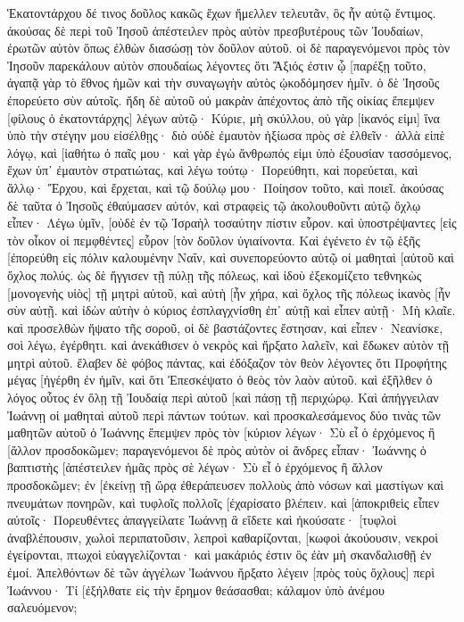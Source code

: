 Ἑκατοντάρχου δέ τινος δοῦλος κακῶς ἔχων ἤμελλεν τελευτᾶν, ὃς ἦν αὐτῷ ἔντιμος. 
ἀκούσας δὲ περὶ τοῦ Ἰησοῦ ἀπέστειλεν πρὸς αὐτὸν πρεσβυτέρους τῶν Ἰουδαίων, ἐρωτῶν αὐτὸν ὅπως ἐλθὼν διασώσῃ τὸν δοῦλον αὐτοῦ. 
οἱ δὲ παραγενόμενοι πρὸς τὸν Ἰησοῦν παρεκάλουν αὐτὸν σπουδαίως λέγοντες ὅτι Ἄξιός ἐστιν ᾧ [παρέξῃ τοῦτο, 
ἀγαπᾷ γὰρ τὸ ἔθνος ἡμῶν καὶ τὴν συναγωγὴν αὐτὸς ᾠκοδόμησεν ἡμῖν. 
ὁ δὲ Ἰησοῦς ἐπορεύετο σὺν αὐτοῖς. ἤδη δὲ αὐτοῦ οὐ μακρὰν ἀπέχοντος ἀπὸ τῆς οἰκίας ἔπεμψεν [φίλους ὁ ἑκατοντάρχης] λέγων αὐτῷ· Κύριε, μὴ σκύλλου, οὐ γὰρ [ἱκανός εἰμι] ἵνα ὑπὸ τὴν στέγην μου εἰσέλθῃς· 
διὸ οὐδὲ ἐμαυτὸν ἠξίωσα πρὸς σὲ ἐλθεῖν· ἀλλὰ εἰπὲ λόγῳ, καὶ [ἰαθήτω ὁ παῖς μου· 
καὶ γὰρ ἐγὼ ἄνθρωπός εἰμι ὑπὸ ἐξουσίαν τασσόμενος, ἔχων ὑπ᾽ ἐμαυτὸν στρατιώτας, καὶ λέγω τούτῳ· Πορεύθητι, καὶ πορεύεται, καὶ ἄλλῳ· Ἔρχου, καὶ ἔρχεται, καὶ τῷ δούλῳ μου· Ποίησον τοῦτο, καὶ ποιεῖ. 
ἀκούσας δὲ ταῦτα ὁ Ἰησοῦς ἐθαύμασεν αὐτόν, καὶ στραφεὶς τῷ ἀκολουθοῦντι αὐτῷ ὄχλῳ εἶπεν· Λέγω ὑμῖν, [οὐδὲ ἐν τῷ Ἰσραὴλ τοσαύτην πίστιν εὗρον. 
καὶ ὑποστρέψαντες [εἰς τὸν οἶκον οἱ πεμφθέντες] εὗρον [τὸν δοῦλον ὑγιαίνοντα. 
Καὶ ἐγένετο ἐν τῷ ἑξῆς [ἐπορεύθη εἰς πόλιν καλουμένην Ναΐν, καὶ συνεπορεύοντο αὐτῷ οἱ μαθηταὶ [αὐτοῦ καὶ ὄχλος πολύς. 
ὡς δὲ ἤγγισεν τῇ πύλῃ τῆς πόλεως, καὶ ἰδοὺ ἐξεκομίζετο τεθνηκὼς [μονογενὴς υἱὸς] τῇ μητρὶ αὐτοῦ, καὶ αὐτὴ [ἦν χήρα, καὶ ὄχλος τῆς πόλεως ἱκανὸς [ἦν σὺν αὐτῇ. 
καὶ ἰδὼν αὐτὴν ὁ κύριος ἐσπλαγχνίσθη ἐπ᾽ αὐτῇ καὶ εἶπεν αὐτῇ· Μὴ κλαῖε. 
καὶ προσελθὼν ἥψατο τῆς σοροῦ, οἱ δὲ βαστάζοντες ἔστησαν, καὶ εἶπεν· Νεανίσκε, σοὶ λέγω, ἐγέρθητι. 
καὶ ἀνεκάθισεν ὁ νεκρὸς καὶ ἤρξατο λαλεῖν, καὶ ἔδωκεν αὐτὸν τῇ μητρὶ αὐτοῦ. 
ἔλαβεν δὲ φόβος πάντας, καὶ ἐδόξαζον τὸν θεὸν λέγοντες ὅτι Προφήτης μέγας [ἠγέρθη ἐν ἡμῖν, καὶ ὅτι Ἐπεσκέψατο ὁ θεὸς τὸν λαὸν αὐτοῦ. 
καὶ ἐξῆλθεν ὁ λόγος οὗτος ἐν ὅλῃ τῇ Ἰουδαίᾳ περὶ αὐτοῦ [καὶ πάσῃ τῇ περιχώρῳ. 
Καὶ ἀπήγγειλαν Ἰωάννῃ οἱ μαθηταὶ αὐτοῦ περὶ πάντων τούτων. καὶ προσκαλεσάμενος δύο τινὰς τῶν μαθητῶν αὐτοῦ ὁ Ἰωάννης 
ἔπεμψεν πρὸς τὸν [κύριον λέγων· Σὺ εἶ ὁ ἐρχόμενος ἢ [ἄλλον προσδοκῶμεν; 
παραγενόμενοι δὲ πρὸς αὐτὸν οἱ ἄνδρες εἶπαν· Ἰωάννης ὁ βαπτιστὴς [ἀπέστειλεν ἡμᾶς πρὸς σὲ λέγων· Σὺ εἶ ὁ ἐρχόμενος ἢ ἄλλον προσδοκῶμεν; 
ἐν [ἐκείνῃ τῇ ὥρᾳ ἐθεράπευσεν πολλοὺς ἀπὸ νόσων καὶ μαστίγων καὶ πνευμάτων πονηρῶν, καὶ τυφλοῖς πολλοῖς [ἐχαρίσατο βλέπειν. 
καὶ [ἀποκριθεὶς εἶπεν αὐτοῖς· Πορευθέντες ἀπαγγείλατε Ἰωάννῃ ἃ εἴδετε καὶ ἠκούσατε· [τυφλοὶ ἀναβλέπουσιν, χωλοὶ περιπατοῦσιν, λεπροὶ καθαρίζονται, [κωφοὶ ἀκούουσιν, νεκροὶ ἐγείρονται, πτωχοὶ εὐαγγελίζονται· 
καὶ μακάριός ἐστιν ὃς ἐὰν μὴ σκανδαλισθῇ ἐν ἐμοί. 
Ἀπελθόντων δὲ τῶν ἀγγέλων Ἰωάννου ἤρξατο λέγειν [πρὸς τοὺς ὄχλους] περὶ Ἰωάννου· Τί [ἐξήλθατε εἰς τὴν ἔρημον θεάσασθαι; κάλαμον ὑπὸ ἀνέμου σαλευόμενον; 
